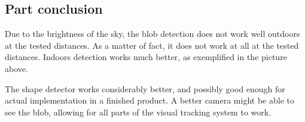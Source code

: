 \subsection{Part conclusion}
Due to the brightness of the sky, the blob detection does not work well outdoors at the tested distances. As a matter of fact, it does not work at all at the tested distances. Indoors detection works much better, as exemplified in the picture above. 

The shape detector works considerably better, and possibly good enough for actual implementation in a finished product. A better camera might be able to see the blob, allowing for all parts of the visual tracking system to work.